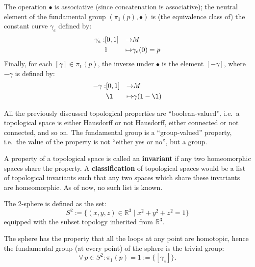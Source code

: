 \documentclass[root.tex]{subfiles}
\begin{document}
The operation $\bullet$ is associative (since concatenation is associative); the neutral element of the fundamental group $(\pi_1(p),\bullet)$ is (the equivalence class of) the constant curve $\gamma_e$ defined by:
$$ \begin{aligned}
\gamma_e : & [0,1] & \to & M\\
& \l & \mapsto & \gamma_e(0) = p
\end{aligned} $$
Finally, for each $[\gamma]\in\pi_1(p)$, the inverse under $\bullet$ is the element $[-\gamma]$, where $-\gamma$ is defined by:
$$ \begin{aligned}
-\gamma : & [0,1] & \to & M\\
& \l & \mapsto & \gamma(1-\l)
\end{aligned} $$

All the previously discussed topological properties are ``boolean-valued'', i.e.\ a topological space is either Hausdorff or not Hausdorff, either connected or not connected, and so on. The fundamental group is a ``group-valued'' property, i.e.\ the value of the property is not ``either yes or no'', but a group. 

A property of a topological space is called an \textbf{invariant} if any two homeomorphic spaces share the property. A \textbf{classification} of topological spaces would be a list of topological invariants such that any two spaces which share these invariants are homeomorphic. As of now, no such list is known. 

\begin{myex}
The 2-sphere is defined as the set:
$$
S^2:=\{(x,y,z)\in \mathbb{R}^3\mid x^2+y^2+z^2=1\}
$$
equipped with the subset topology inherited from $\mathbb{R}^3$.

\begin{center}
\end{center}

The sphere has the property that all the loops at any point are homotopic, hence the fundamental group (at every point) of the sphere is the trivial group:
$$
\forall \, p \in S^2 : \pi_1(p) = 1:=\{[\gamma_e]\}.
$$
\end{myex}
\end{document}
